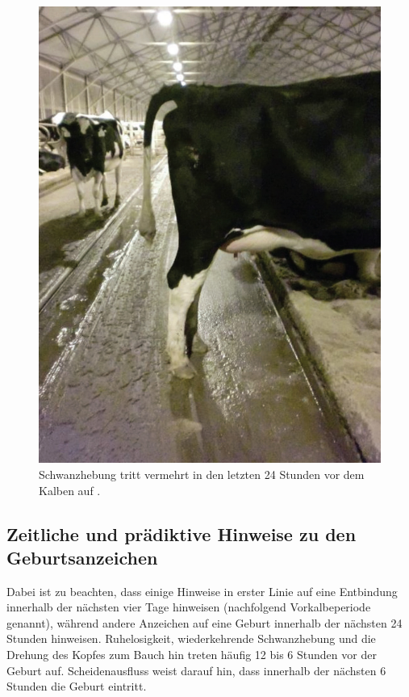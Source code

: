 \begin{figure}[H]
	\center
	\includegraphics[scale=.45]{Grafiken/schwanzhebung.jpg}
	\caption{Schwanzhebung tritt vermehrt in den letzten 24 Stunden vor dem Kalben auf \citep[S. 4847 	f.]{Lange2017}.}
	\label{fig: Schwanzhebung}
\end{figure}

\subsection{Zeitliche und prädiktive Hinweise zu den Geburtsanzeichen}
Dabei ist zu beachten, dass einige Hinweise in erster Linie auf eine Entbindung innerhalb der nächsten vier Tage hinweisen (nachfolgend Vorkalbeperiode genannt), während andere Anzeichen auf eine Geburt innerhalb der nächsten 24 Stunden hinweisen. Ruhelosigkeit, wiederkehrende Schwanzhebung und die Drehung des Kopfes zum Bauch hin treten häufig 12 bis 6 Stunden vor der Geburt auf. Scheidenausfluss weist darauf hin, dass innerhalb der nächsten 6 Stunden die Geburt eintritt. \citep[S. 4847]{Lange2017}


